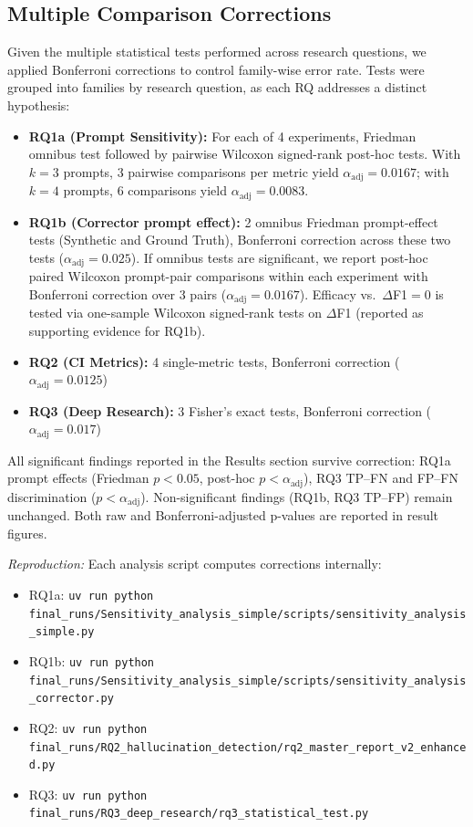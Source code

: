 \subsection{Multiple Comparison Corrections}

Given the multiple statistical tests performed across research questions, we applied Bonferroni corrections to control family-wise error rate. Tests were grouped into families by research question, as each RQ addresses a distinct hypothesis:

\begin{itemize}[noitemsep]
    \item \textbf{RQ1a (Prompt Sensitivity):} For each of 4 experiments, Friedman omnibus test followed by pairwise Wilcoxon signed-rank post-hoc tests. With $k=3$ prompts, 3 pairwise comparisons per metric yield $\alpha_{\text{adj}} = 0.0167$; with $k=4$ prompts, 6 comparisons yield $\alpha_{\text{adj}} = 0.0083$.
    \item \textbf{RQ1b (Corrector prompt effect):} 2 omnibus Friedman prompt-effect tests (Synthetic and Ground Truth), Bonferroni correction across these two tests ($\alpha_{\text{adj}} = 0.025$). If omnibus tests are significant, we report post-hoc paired Wilcoxon prompt-pair comparisons within each experiment with Bonferroni correction over 3 pairs ($\alpha_{\text{adj}}=0.0167$). Efficacy vs.\ $\Delta$F1$=0$ is tested via one-sample Wilcoxon signed-rank tests on $\Delta$F1 (reported as supporting evidence for RQ1b).
    \item \textbf{RQ2 (CI Metrics):} 4 single-metric tests, Bonferroni correction ($\alpha_{\text{adj}} = 0.0125$)
    \item \textbf{RQ3 (Deep Research):} 3 Fisher's exact tests, Bonferroni correction ($\alpha_{\text{adj}} = 0.017$)
\end{itemize}

All significant findings reported in the Results section survive correction: RQ1a prompt effects (Friedman $p < 0.05$, post-hoc $p < \alpha_{\text{adj}}$), RQ3 TP--FN and FP--FN discrimination ($p < \alpha_{\text{adj}}$). Non-significant findings (RQ1b, RQ3 TP--FP) remain unchanged. Both raw and Bonferroni-adjusted p-values are reported in result figures.

\textit{Reproduction:} Each analysis script computes corrections internally:
\begin{itemize}[noitemsep]
    \item RQ1a: \texttt{uv run python final\_runs/Sensitivity\_analysis\_simple/scripts/sensitivity\_analysis\_simple.py}
    \item RQ1b: \texttt{uv run python final\_runs/Sensitivity\_analysis\_simple/scripts/sensitivity\_analysis\_corrector.py}
    \item RQ2: \texttt{uv run python final\_runs/RQ2\_hallucination\_detection/rq2\_master\_report\_v2\_enhanced.py}
    \item RQ3: \texttt{uv run python final\_runs/RQ3\_deep\_research/rq3\_statistical\_test.py}
\end{itemize}

